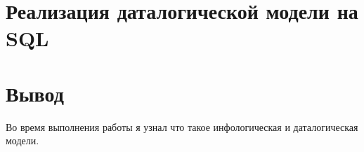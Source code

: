 \documentclass{article}
\begin{document}
\section{Реализация даталогической модели на SQL}

\lstset{language=SQL}

\section{Вывод}
Во время выполнения работы я узнал что такое инфологическая и даталогическая модели.
\end{document}
